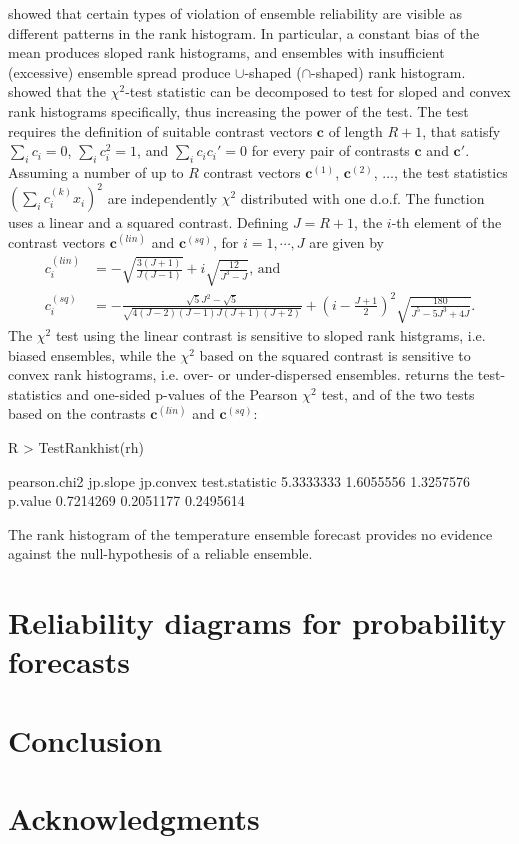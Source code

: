 \documentclass[article]{jss}
\begin{document}
\citet{hamill2001interpretation} showed that certain types of violation of ensemble reliability are visible as different patterns in the rank histogram.
In particular, a constant bias of the mean produces sloped rank histograms, and ensembles with insufficient (excessive) ensemble spread produce $\cup$-shaped ($\cap$-shaped) rank histogram.
\citet{jolliffe2008evaluating} showed that the $\chi^2$-test statistic can be decomposed to test for sloped and convex rank histograms specifically, thus increasing the power of the test.
The test requires the definition of suitable contrast vectors $\mathbf{c}$ of length $R+1$, that satisfy $\sum_i c_i = 0$, $\sum_i c_i^2 = 1$, and $\sum_i c_i c_i' = 0$ for every pair of contrasts $\mathbf{c}$ and $\mathbf{c}'$.
Assuming a number of up to $R$ contrast vectors $\mathbf{c}^{(1)}$, $\mathbf{c}^{(2)}$, $\dots$, the test statistics $(\sum_i c^{(k)}_i x_i)^2$ are independently $\chi^2$ distributed with one d.o.f. 
The function  uses a linear and a squared contrast. Defining $J=R+1$, the $i$-th element of the contrast vectors $\mathbf{c}^{(lin)}$ and $\mathbf{c}^{(sq)}$, for $i=1,\cdots,J$ are given by
%
\begin{align}
c^{(lin)}_i & = -\sqrt{\frac{3(J+1)}{J (J-1)}} + i \sqrt{\frac{12}{J^3 - J}}\text{, and}\\
c^{(sq)}_i & =  - \frac{\sqrt{5}  J^2 - \sqrt{5}}{\sqrt{4(J - 2)  (J-1) J (J+1) (J+2)}}+ \left(i - \frac{J+1}{2}\right)^2   \sqrt{\frac{180}{ J^5 - 5 J^3 + 4 J}}.
\end{align}
%
The $\chi^2$ test using the linear contrast is sensitive to sloped rank histgrams, i.e. biased ensembles, while the $\chi^2$ based on the squared contrast is sensitive to convex rank histograms, i.e. over- or under-dispersed ensembles.
 returns the test-statistics and one-sided p-values of the Pearson $\chi^2$ test, and of the two tests based on the contrasts $\mathbf{c}^{(lin)}$ and $\mathbf{c}^{(sq)}$:
%
\begin{Schunk}
\begin{Sinput}
R > TestRankhist(rh)
\end{Sinput}
\begin{Soutput}
               pearson.chi2  jp.slope jp.convex
test.statistic    5.3333333 1.6055556 1.3257576
p.value           0.7214269 0.2051177 0.2495614
\end{Soutput}
\end{Schunk}
%
The rank histogram of the temperature ensemble forecast provides no evidence against the null-hypothesis of a reliable ensemble.

\section{Reliability diagrams for probability forecasts}



\section{Conclusion}

\section*{Acknowledgments}



\end{document}
